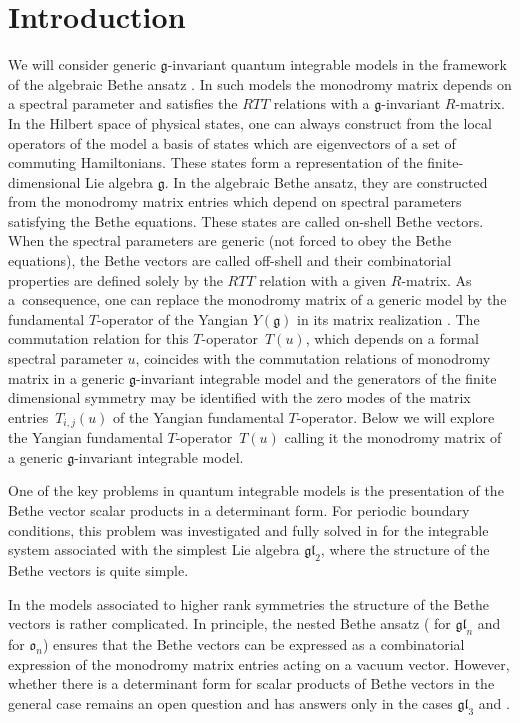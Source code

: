\documentclass[pdftex]{sigma}
\theoremstyle{definition}
\begin{document}

\section{Introduction}

We will consider generic $\mathfrak{g}$-invariant quantum integrable models
in the framework of the algebraic Bethe ansatz \cite{Fad96}. In such models the
monodromy matrix depends on a spectral parameter and satisfies the $RTT$ relations \cite{FRT} with a $\mathfrak{g}$-invariant
$R$-matrix. In the Hilbert space of physical states,
one can always construct from the local operators of the model a basis of states
 which are eigenvectors of a set of commuting Hamiltonians. These states form a representation of the finite-dimensional Lie
algebra $\mathfrak{g}$. In the algebraic
Bethe ansatz, they are constructed from the monodromy matrix entries
which depend on spectral parameters satisfying the Bethe equations.
These states are called on-shell Bethe vectors. When the spectral parameters
are generic (not forced to obey the Bethe equations), the Bethe vectors are called off-shell and their combinatorial properties
are defined solely by the $RTT$ relation with a given $R$-matrix.
As a~consequence, one can replace the monodromy matrix of a generic
model by the fundamental $T$-operator of the Yangian $Y(\mathfrak{g})$
in its matrix realization \cite{Drinfeld,Molev}.
The commutation relation for this $T$-operator~$T(u)$,
which depends on a formal spectral parameter $u$, coincides with
the commutation relations of monodromy matrix in a generic $\mathfrak{g}$-invariant
integrable model and the generators of the finite dimensional symmetry
may be identified with the zero modes of the matrix entries~$T_{i,j}(u)$
of the Yangian fundamental $T$-operator. Below we will explore the
Yangian fundamental $T$-operator~$T(u)$ calling it the monodromy
matrix of a generic $\mathfrak{g}$-invariant integrable model.


One of the key problems in quantum integrable models is the presentation
of the Bethe vector scalar products in a determinant form.
For periodic boundary conditions, this problem was
investigated and fully solved in \cite{S-Det89}
for the integrable system associated with the simplest Lie algebra $\mathfrak{gl}_2$,
where the structure of the Bethe vectors is quite simple.




In the models associated to higher rank symmetries the structure of the Bethe vectors
is rather complicated. In principle, the nested Bethe ansatz (\cite{KR1, KR2} for $\mathfrak{gl}_n$ and \cite{Res91} for $\mathfrak{o}_n$) ensures that the
Bethe vectors can be expressed as a combinatorial expression
of the monodromy matrix entries acting on a vacuum vector.
However, whether there is a determinant form for scalar products of Bethe vectors in the general case remains an open question and has answers only in the cases $\mathfrak{gl}_3$ \cite{BPRS12} and  \cite{HLPRS16}.
\end{document}
